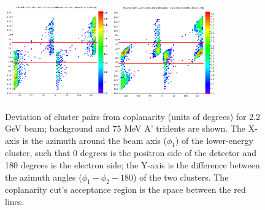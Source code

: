 \begin{figure}[ht]
	\includegraphics[width=0.4\textwidth]{performance/trigger/coplanarity_22}
	\includegraphics[width=0.4\textwidth]{performance/trigger/coplanarity_22_075mev}
	\caption{\small{Deviation of cluster pairs from coplanarity (units of degrees) for 2.2 GeV beam; background and 75 MeV A' tridents are shown. The X-axis is the azimuth around the beam axis ($\phi_1$) of the lower-energy cluster, such that 0 degrees is the positron side of the detector and 180 degrees is the electron side; the Y-axis is the difference between the azimuth angles ($\phi_1-\phi_2 - 180$) of the two clusters. The coplanarity cut's acceptance region is the space between the red lines.}}
	\label{fig:coplanarity}
\end{figure}

